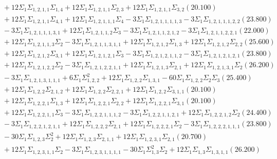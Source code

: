 \documentclass[12pt]{article}
\begin{document}
\begin{landscape}
\begin{align*}
		&\quad\quad +12\Sigma_{1}\Sigma_{1,2,1,1}\Sigma_{1,4}+12\Sigma_{1}\Sigma_{1,2,1,1}\Sigma_{2,3}+12\Sigma_{1}\Sigma_{1,2,1,1}\Sigma_{3,2}(20.100) \\ 
		&\quad\quad +12\Sigma_{1}\Sigma_{1,2,1,1}\Sigma_{4,1}+12\Sigma_{1}\Sigma_{1,2,1,1,1}\Sigma_{4}-3\Sigma_{1}\Sigma_{1,2,1,1,1,1,3}-3\Sigma_{1}\Sigma_{1,2,1,1,1,2,2}(23.800) \\ 
		&\quad\quad -3\Sigma_{1}\Sigma_{1,2,1,1,1,3,1}+12\Sigma_{1}\Sigma_{1,2,1,1,2}\Sigma_{3}-3\Sigma_{1}\Sigma_{1,2,1,1,2,1,2}-3\Sigma_{1}\Sigma_{1,2,1,1,2,2,1}(22.000) \\ 
		&\quad\quad +12\Sigma_{1}\Sigma_{1,2,1,1,3}\Sigma_{2}-3\Sigma_{1}\Sigma_{1,2,1,1,3,1,1}+12\Sigma_{1}\Sigma_{1,2,1,2}\Sigma_{1,3}+12\Sigma_{1}\Sigma_{1,2,1,2}\Sigma_{2,2}(25.600) \\ 
		&\quad\quad +12\Sigma_{1}\Sigma_{1,2,1,2}\Sigma_{3,1}+12\Sigma_{1}\Sigma_{1,2,1,2,1}\Sigma_{3}-3\Sigma_{1}\Sigma_{1,2,1,2,1,1,2}-3\Sigma_{1}\Sigma_{1,2,1,2,1,2,1}(23.800) \\ 
		&\quad\quad +12\Sigma_{1}\Sigma_{1,2,1,2,2}\Sigma_{2}-3\Sigma_{1}\Sigma_{1,2,1,2,2,1,1}+12\Sigma_{1}\Sigma_{1,2,1,3}\Sigma_{2,1}+12\Sigma_{1}\Sigma_{1,2,1,3,1}\Sigma_{2}(26.200) \\ 
		&\quad\quad -3\Sigma_{1}\Sigma_{1,2,1,3,1,1,1}+6\Sigma_{1}\Sigma_{1,2,2}^{2}+12\Sigma_{1}\Sigma_{1,2,2}\Sigma_{1,3,1}-60\Sigma_{1}\Sigma_{1,2,2}\Sigma_{2}\Sigma_{3}(25.400) \\ 
		&\quad\quad +12\Sigma_{1}\Sigma_{1,2,2}\Sigma_{2,1,2}+12\Sigma_{1}\Sigma_{1,2,2}\Sigma_{2,2,1}+12\Sigma_{1}\Sigma_{1,2,2}\Sigma_{3,1,1}(20.100) \\ 
		&\quad\quad +12\Sigma_{1}\Sigma_{1,2,2,1}\Sigma_{1,3}+12\Sigma_{1}\Sigma_{1,2,2,1}\Sigma_{2,2}+12\Sigma_{1}\Sigma_{1,2,2,1}\Sigma_{3,1}(20.100) \\ 
		&\quad\quad +12\Sigma_{1}\Sigma_{1,2,2,1,1}\Sigma_{3}-3\Sigma_{1}\Sigma_{1,2,2,1,1,1,2}-3\Sigma_{1}\Sigma_{1,2,2,1,1,2,1}+12\Sigma_{1}\Sigma_{1,2,2,1,2}\Sigma_{2}(24.400) \\ 
		&\quad\quad -3\Sigma_{1}\Sigma_{1,2,2,1,2,1,1}+12\Sigma_{1}\Sigma_{1,2,2,2}\Sigma_{2,1}+12\Sigma_{1}\Sigma_{1,2,2,2,1}\Sigma_{2}-3\Sigma_{1}\Sigma_{1,2,2,2,1,1,1}(23.800) \\ 
		&\quad\quad -30\Sigma_{1}\Sigma_{1,2,3}\Sigma_{2}^{2}+12\Sigma_{1}\Sigma_{1,2,3}\Sigma_{2,1,1}+12\Sigma_{1}\Sigma_{1,2,3,1}\Sigma_{2,1}(20.700) \\ 
		&\quad\quad +12\Sigma_{1}\Sigma_{1,2,3,1,1}\Sigma_{2}-3\Sigma_{1}\Sigma_{1,2,3,1,1,1,1}-30\Sigma_{1}\Sigma_{1,3}^{2}\Sigma_{2}+12\Sigma_{1}\Sigma_{1,3}\Sigma_{1,3,1,1}(26.200) \\ 

\end{align*}
\end{landscape}
\end{document}
